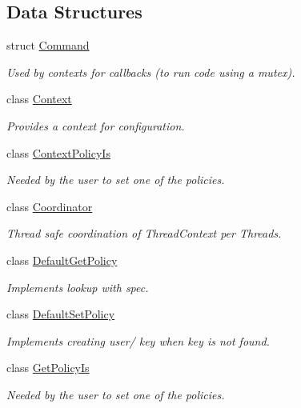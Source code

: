 \subsection*{Data Structures}
\begin{DoxyCompactItemize}
\item 
struct \hyperlink{structkdb_1_1Command}{Command}
\begin{DoxyCompactList}\small\item\em Used by contexts for callbacks (to run code using a mutex). \end{DoxyCompactList}\item 
class \hyperlink{classkdb_1_1Context}{Context}
\begin{DoxyCompactList}\small\item\em Provides a context for configuration. \end{DoxyCompactList}\item 
class \hyperlink{classkdb_1_1ContextPolicyIs}{Context\+Policy\+Is}
\begin{DoxyCompactList}\small\item\em Needed by the user to set one of the policies. \end{DoxyCompactList}\item 
class \hyperlink{classkdb_1_1Coordinator}{Coordinator}
\begin{DoxyCompactList}\small\item\em Thread safe coordination of Thread\+Context per Threads. \end{DoxyCompactList}\item 
class \hyperlink{classkdb_1_1DefaultGetPolicy}{Default\+Get\+Policy}
\begin{DoxyCompactList}\small\item\em Implements lookup with spec. \end{DoxyCompactList}\item 
class \hyperlink{classkdb_1_1DefaultSetPolicy}{Default\+Set\+Policy}
\begin{DoxyCompactList}\small\item\em Implements creating user/ key when key is not found. \end{DoxyCompactList}\item 
class \hyperlink{classkdb_1_1GetPolicyIs}{Get\+Policy\+Is}
\begin{DoxyCompactList}\small\item\em Needed by the user to set one of the policies. \end{DoxyCompactList}\item 

\end{DoxyCompactItemize}
